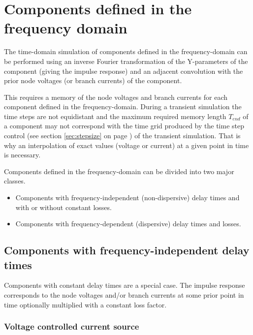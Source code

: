 \section{Components defined in the frequency domain}

The time-domain simulation of components defined in the
frequency-domain can be performed using an inverse Fourier
transformation of the Y-parameters of the component (giving the
impulse response) and an adjacent convolution with the prior node
voltages (or branch currents) of the component.

\addvspace{12pt}

This requires a memory of the node voltages and branch currents for
each component defined in the frequency-domain.  During a transient
simulation the time steps are not equidistant and the maximum required
memory length $T_{end}$ of a component may not correspond with the
time grid produced by the time step control (see section
\ref{sec:stepsize} on page \pageref{sec:stepsize}) of the transient
simulation.  That is why an interpolation of exact values (voltage or
current) at a given point in time is necessary.

\addvspace{12pt}

Components defined in the frequency-domain can be divided into two
major classes.

\begin{itemize}
\item Components with frequency-independent (non-dispersive) delay
times and with or without constant losses.
\item Components with frequency-dependent (dispersive) delay times and
losses.
\end{itemize}

\subsection{Components with frequency-independent delay times}

Components with constant delay times are a special case.  The impulse
response corresponds to the node voltages and/or branch currents at
some prior point in time optionally multiplied with a constant loss
factor.

\subsubsection{Voltage controlled current source}

